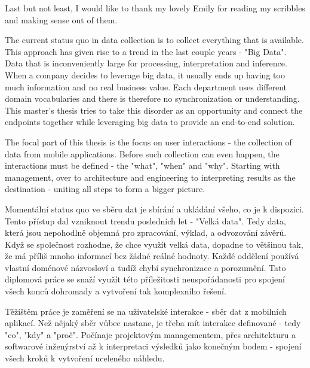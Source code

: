 \documentclass[11pt,twoside,a4paper]{book}
\begin{document}
\bigbreak

Last but not least, I would like to thank my lovely Emily for reading my scribbles and making sense out of them.





 
\abstractpage

The current status quo in data collection is to collect everything that is available. This approach has given rise to a trend in the last couple years - "Big Data". Data that is inconveniently large for processing, interpretation and inference. When a company decides to leverage big data, it usually ends up having too much information and no real business value. Each department uses different domain vocabularies and there is therefore no synchronization or understanding. This master's thesis tries to take this disorder as an opportunity and connect the endpoints together while leveraging big data to provide an end-to-end solution.

The focal part of this thesis is the focus on user interactions - the collection of data from mobile applications. Before such collection can even happen, the interactions must be defined - the "what", "when" and "why". Starting with management, over to architecture and engineering to interpreting results as the destination - uniting all steps to form a bigger picture.



\baselineskip

\noindent
Momentální status quo ve sběru dat je sbírání a ukládání všeho, co je k dispozici. Tento přístup dal vzniknout trendu posledních let - "Velká data". Tedy data, která jsou  nepohodlně objemná pro zpracování, výklad, a odvozování závěrů. Když se společnost rozhodne, že chce využít velká data, dopadne to většinou tak, že má příliš mnoho informací bez žádné reálné hodnoty. Každé oddělení používá vlastní doménové názvosloví a tudíž chybí synchronizace a porozumění. Tato diplomová práce se snaží využít této příležitosti neuspořádanosti pro spojení všech konců dohromady a vytvoření tak komplexního řešení.

Těžištěm práce je zaměření se na uživatelské interakce - sběr dat z mobilních aplikací. Než nějaký sběr vůbec nastane, je třeba mít interakce definované - tedy "co", "kdy" a "proč". Počínaje projektovým managementem, přes architekturu a softwarové inženýrství až k interpretaci výsledků jako konečným bodem - spojení všech kroků k vytvoření uceleného náhledu.
\end{document}
